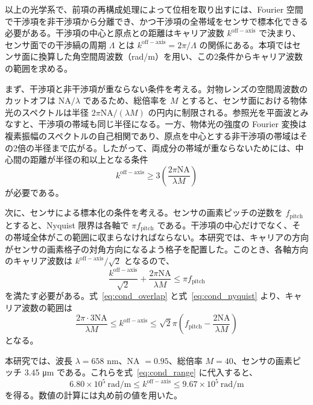 以上の光学系で、前項の再構成処理によって位相を取り出すには、Fourier 空間で干渉項を非干渉項から分離でき、かつ干渉項の全帯域をセンサで標本化できる必要がある。干渉項の中心と原点との距離はキャリア波数 $k^{\mathrm{off-axis}}$ で決まり、センサ面での干渉縞の周期 $\Lambda$ とは $k^{\mathrm{off-axis}} = 2\pi/\Lambda$ の関係にある。本項ではセンサ面に換算した角空間周波数（rad/m）を用い、この2条件からキャリア波数の範囲を求める。

まず、干渉項と非干渉項が重ならない条件を考える。対物レンズの空間周波数のカットオフは $\mathrm{NA}/\lambda$ であるため、総倍率を $M$ とすると、センサ面における物体光のスペクトルは半径 $2\pi\mathrm{NA}/(\lambda M)$ の円内に制限される。参照光を平面波とみなすと、干渉項の帯域も同じ半径になる。一方、物体光の強度の Fourier 変換は複素振幅のスペクトルの自己相関であり、原点を中心とする非干渉項の帯域はその2倍の半径まで広がる。したがって、両成分の帯域が重ならないためには、中心間の距離が半径の和以上となる条件
\begin{equation}
k^{\mathrm{off-axis}} \geq 3 \left(\frac{2\pi \mathrm{NA}}{\lambda M}\right)
\label{eq:cond_overlap}
\end{equation}
が必要である。

次に、センサによる標本化の条件を考える。センサの画素ピッチの逆数を $f_{\mathrm{pitch}}$ とすると、Nyquist 限界は各軸で $\pi f_{\mathrm{pitch}}$ である。干渉項の中心だけでなく、その帯域全体がこの範囲に収まらなければならない。本研究では、キャリアの方向がセンサの画素格子の対角方向になるよう格子を配置した。このとき、各軸方向のキャリア波数は $k^{\mathrm{off-axis}}/\sqrt{2}$ となるので、
\begin{equation}
\frac{k^{\mathrm{off-axis}}}{\sqrt{2}} + \frac{2\pi \mathrm{NA}}{\lambda M} \leq \pi f_{\mathrm{pitch}}
\label{eq:cond_nyquist}
\end{equation}
を満たす必要がある。式~\eqref{eq:cond_overlap} と式~\eqref{eq:cond_nyquist} より、キャリア波数の範囲は
\begin{equation}
\frac{2\pi \cdot 3\mathrm{NA}}{\lambda M} \leq k^{\mathrm{off-axis}} \leq \sqrt{2}\pi \left(f_{\mathrm{pitch}} - \frac{2\mathrm{NA}}{\lambda M}\right)
\label{eq:cond_range}
\end{equation}
となる。

本研究では、波長 $\lambda = 658$ nm、NA $= 0.95$、総倍率 $M = 40$、センサの画素ピッチ 3.45 μm である。これらを式~\eqref{eq:cond_range} に代入すると、
\begin{equation}
6.80 \times 10^5~\mathrm{rad/m} \leq k^{\mathrm{off-axis}} \leq 9.67 \times 10^5~\mathrm{rad/m}
\end{equation}
を得る。数値の計算には丸め前の値を用いた。

